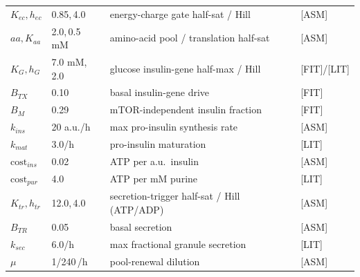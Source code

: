 \documentclass[11pt]{article}
\begin{document}
\begin{longtable}{@{}llll@{}}
$K_{ec},h_{ec}$ & 0.85,\,4.0 & energy-charge gate half-sat / Hill & [ASM]\\
$aa,K_{aa}$ & 2.0,\,0.5 mM & amino-acid pool / translation half-sat & [ASM]\\
$K_{G},h_{G}$ & 7.0 mM,\,2.0 & glucose insulin-gene half-max / Hill & [FIT]/[LIT]\\
$B_{TX}$ & 0.10 & basal insulin-gene drive & [FIT]\\
$B_{M}$ & 0.29 & mTOR-independent insulin fraction & [FIT]\\
$k_{ins}$ & 20 a.u./h & max pro-insulin synthesis rate & [ASM]\\
$k_{mat}$ & 3.0/h & pro-insulin maturation & [LIT]\\
$\mathrm{cost}_{ins}$ & 0.02 & ATP per a.u.\ insulin & [ASM]\\
$\mathrm{cost}_{pur}$ & 4.0 & ATP per mM purine & [LIT]\\
$K_{tr},h_{tr}$ & 12.0,\,4.0 & secretion-trigger half-sat / Hill (ATP/ADP) & [ASM]\\
$B_{TR}$ & 0.05 & basal secretion & [ASM]\\
$k_{sec}$ & 6.0/h & max fractional granule secretion & [LIT]\\
$\mu$ & 1/240\,/h & pool-renewal dilution & [ASM]\\
\bottomrule
\end{longtable}
\end{document}

